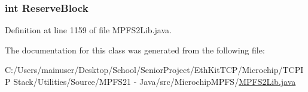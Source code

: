 \subsubsection[{Reserve\+Block}]{\setlength{\rightskip}{0pt plus 5cm}int Reserve\+Block}\label{class_microchip_m_p_f_s_1_1_m_p_f_s2_lib_1_1_m_p_f_s_classic_builder_a58db3d55e60c5ebe306180035cfac9eb}


Definition at line 1159 of file M\+P\+F\+S2\+Lib.\+java.



The documentation for this class was generated from the following file\+:\begin{DoxyCompactItemize}
\item 
C\+:/\+Users/mainuser/\+Desktop/\+School/\+Senior\+Project/\+Eth\+Kit\+T\+C\+P/\+Microchip/\+T\+C\+P\+I\+P Stack/\+Utilities/\+Source/\+M\+P\+F\+S21 -\/ Java/src/\+Microchip\+M\+P\+F\+S/\hyperlink{_m_p_f_s2_lib_8java}{M\+P\+F\+S2\+Lib.\+java}\end{DoxyCompactItemize}
